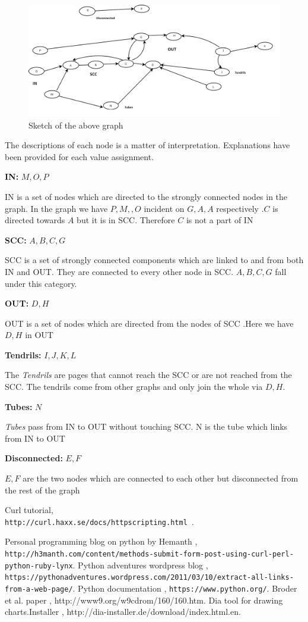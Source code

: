 \documentclass[letterpaper,11pt]{article}
\begin{document}
\begin{figure}
\includegraphics[scale=0.5]{graph.png}
\caption{Sketch of the above graph}
\label{fig:screen8}
\end{figure}

The descriptions of each node is a matter of interpretation.  Explanations have been provided for each value assignment.

\textbf{IN:}  $M, O, P$

IN is a set of nodes which are directed to the strongly connected nodes in the graph. In the graph we have $P, M,,O$ incident on $G,A,A$ respectively .$C$ is directed towards $A$ but it  is in SCC. Therefore $C$ is not a part of IN

\textbf{SCC:}  $A, B, C, G$

SCC is a set of strongly connected components which are linked to and from both IN and OUT. They are connected to every other node in SCC. $A,B,C,G$ fall under this category.

\textbf{OUT:}  $D,H$

OUT is a set of nodes which are directed from the nodes of SCC .Here we have $D,H$ in OUT

\textbf{Tendrils:}  $I, J, K, L$

The \emph{Tendrils} are pages that cannot reach the SCC or are not reached from the SCC.  The tendrils come from other graphs and only join the whole via $D,H$.

\textbf{Tubes:} $N$

\emph {Tubes} pass from IN to OUT without touching SCC. N is the tube which links from IN to OUT

\textbf{Disconnected:}  $E, F$

$E,F$ are the two nodes which are connected to each other but disconnected from the rest of the graph 
\newpage

\begin{thebibliography}{1}
Curl tutorial, 
{\tt \\http://curl.haxx.se/docs/httpscripting.html }.

Personal programming blog on python by Hemanth , 
{\tt  http://h3manth.com/content/methods-submit-form-post-using-curl-perl-python-ruby-lynx}.
Python adventures wordpress blog , 
{\tt https://pythonadventures.wordpress.com/2011/03/10/extract-all-links-from-a-web-page/}.
Python documentation , 
{\tt https://www.python.org/}.
Broder et al. paper , 
{http://www9.org/w9cdrom/160/160.htm}.
Dia tool for drawing charts.Installer , 
{http://dia-installer.de/download/index.html.en}.


\end{thebibliography}
 
\end{document}
